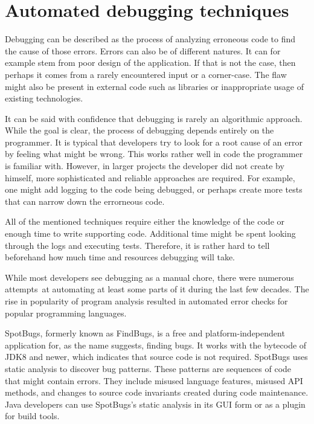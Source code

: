 \chapter{Automated debugging techniques}



Debugging can be described as the process of analyzing erroneous code to find 
the cause of those errors. 
Errors can also be of different natures.
It can for example stem from poor design of the application.
If that is not the case, then perhaps it comes from a rarely
encountered input or a corner-case. 
The flaw might also be present
in external code such as libraries or inappropriate usage of
existing technologies.

It can be said with confidence that debugging is rarely an algorithmic
approach.
While the goal is clear, the process of debugging depends entirely 
on the programmer.
It is typical that developers try to look for a root cause
of an error by feeling what might be wrong.
This works rather well in code the programmer is familiar with.
However, in larger projects the developer did not create by himself,
more sophisticated and reliable approaches are required.
For example, one might add logging to the code being debugged,
or perhaps create more tests that can narrow down the errorneous code.

All of the mentioned techniques require either the knowledge of the code 
or enough time to write supporting code. Additional time might be spent
looking through the logs and executing tests. Therefore, it is rather
hard to tell beforehand how much time and resources debugging will take.

While most developers see debugging as a manual chore, there were numerous 
attempts~at automating at least some parts of it during the last few decades. 
The rise in popularity of program analysis resulted in automated error checks 
for popular programming languages. 

SpotBugs, formerly known as FindBugs, is a free and platform-independent 
application for, as the name suggests, finding bugs.
It works with the bytecode of JDK8 and newer, which indicates that source 
code is not required.
SpotBugs uses static analysis to discover bug patterns.
These patterns are sequences of code that might contain errors.
They include misused language features, misused API methods, and changes to 
source code invariants created during code maintenance.
Java developers can use SpotBugs's static analysis in its GUI form or 
as a plugin for build tools.

